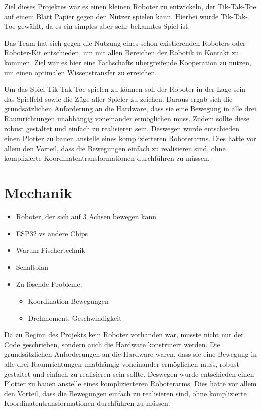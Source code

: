 \documentclass[conference,compsoc,final,a4paper]{IEEEtran}
\begin{document}
Ziel dieses Projektes war es einen kleinen Roboter zu entwickeln, der Tik-Tak-Toe
auf einem Blatt Papier gegen den Nutzer spielen kann. Hierbei wurde Tik-Tak-Toe
gewählt, da es ein simples aber sehr bekanntes Spiel ist.

Das Team hat sich gegen die Nutzung eines schon existierenden Roboters oder Roboter-Kit
entschieden, um mit allen Bereichen der Robotik in Kontakt zu kommen. Ziel war es hier
eine Fachschafts übergreifende Kooperation zu nutzen, um einen optimalen Wissenstransfer
zu erreichen.

Um das Spiel Tik-Tak-Toe spielen zu können soll der Roboter in der Lage sein das Spielfeld
sowie die Züge aller Spieler zu zeichen. Daraus ergab sich die grundsätzlichen Anforderung
an die Hardware, dass sie eine Bewegung in alle drei Raumrichtungen unabhängig voneinander
ermöglichen muss. Zudem sollte diese robust gestaltet und einfach zu realisieren sein.
Deswegen wurde entschieden einen Plotter zu bauen anstelle eines komplizierteren
Roboterarms. Dies hatte vor allem den Vorteil, dass die Bewegungen einfach zu realisieren
sind, ohne komplizierte Koordinatentransformationen durchführen zu müssen.


\section{Mechanik}

\begin{itemize}
  \item Roboter, der sich auf 3 Achsen bewegen kann
  \item ESP32 vs andere Chips
  \item Warum Fischertechnik
  \item Schaltplan
  \item Zu lösende Probleme:
    \begin{itemize}
      \item Koordination Bewegungen
      \item Drehmoment, Geschwindigkeit
    \end{itemize}
\end{itemize}

Da zu Beginn des Projekts kein Roboter vorhanden war, musste nicht nur der Code geschrieben, sondern auch die Hardware konstruiert werden. Die grundsätzlichen Anforderungen an die Hardware waren, dass sie eine Bewegung in alle drei Raumrichtungen unabhängig voneinander ermöglichen muss, robust gestaltet und einfach zu realisieren sein sollte. Deswegen wurde entschieden einen Plotter zu bauen anstelle eines komplizierteren Roboterarms. Dies hatte vor allem den Vorteil, dass die Bewegungen einfach zu realisieren sind, ohne komplizierte Koordinatentransformationen durchführen zu müssen.
\end{document}

